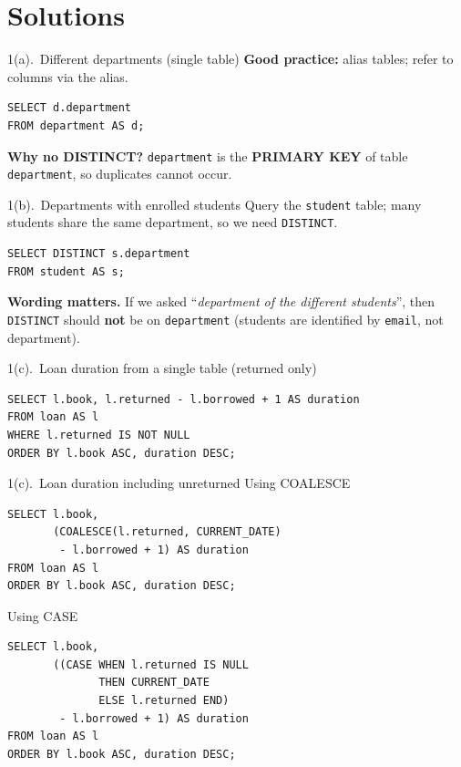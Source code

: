 \documentclass{beamer}
\begin{document}
\section{Solutions}

\begin{frame}[fragile]{1(a).\ Different departments (single table)}
\small
\textbf{Good practice:} alias tables; refer to columns via the alias.
\begin{lstlisting}
SELECT d.department
FROM department AS d;
\end{lstlisting}
\textbf{Why no DISTINCT?} \texttt{department} is the \textbf{PRIMARY KEY} of table \texttt{department}, so duplicates cannot occur.
\end{frame}

\begin{frame}[fragile]{1(b).\ Departments with enrolled students}
\small
Query the \texttt{student} table; many students share the same department, so we need \texttt{DISTINCT}.
\begin{lstlisting}
SELECT DISTINCT s.department
FROM student AS s;
\end{lstlisting}
\textbf{Wording matters.} If we asked “\emph{department of the different students}”, then \texttt{DISTINCT} should \textbf{not} be on \texttt{department} (students are identified by \texttt{email}, not department).
\end{frame}

\begin{frame}[fragile]{1(c).\ Loan duration from a single table (returned only)}
\small
\begin{lstlisting}[style=sqlcompact]
SELECT l.book, l.returned - l.borrowed + 1 AS duration
FROM loan AS l
WHERE l.returned IS NOT NULL
ORDER BY l.book ASC, duration DESC;
\end{lstlisting}
\end{frame}

\begin{frame}[fragile]{1(c).\ Loan duration including unreturned}
\small Using COALESCE
\begin{lstlisting}[style=sqlcompact]
SELECT l.book,
       (COALESCE(l.returned, CURRENT_DATE)
        - l.borrowed + 1) AS duration
FROM loan AS l
ORDER BY l.book ASC, duration DESC;
\end{lstlisting}

\medskip Using CASE
\begin{lstlisting}[style=sqlcompact]
SELECT l.book,
       ((CASE WHEN l.returned IS NULL
              THEN CURRENT_DATE
              ELSE l.returned END)
        - l.borrowed + 1) AS duration
FROM loan AS l
ORDER BY l.book ASC, duration DESC;
\end{lstlisting}
\end{frame}
\end{document}
